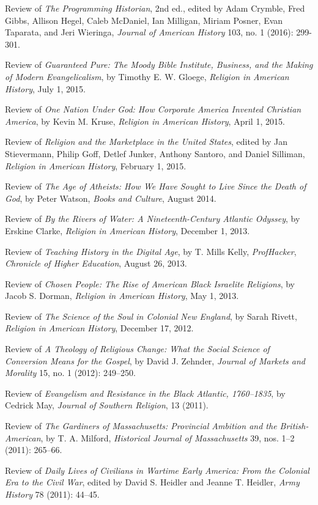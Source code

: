\documentclass[11pt]{article}
\begin{document}
Review of \emph{The Programming Historian}, 2nd ed., edited by
Adam Crymble, Fred Gibbs, Allison Hegel, Caleb McDaniel, Ian Milligan, Miriam 
Posner, Evan Taparata, and Jeri Wieringa, \emph{Journal of American History} 
103, no. 1 (2016): 299-301.

Review of \emph{Guaranteed Pure: The Moody Bible Institute, Business, and the 
  Making of Modern Evangelicalism}, by Timothy E. W. Gloege, \emph{Religion in 
  American History}, July 1, 2015.

Review of \emph{One Nation Under God: How Corporate America Invented Christian 
  America}, by Kevin M. Kruse, \emph{Religion in American History}, April 1, 
2015.

Review of \emph{Religion and the Marketplace in the United States},
edited by Jan Stievermann, Philip Goff, Detlef Junker, Anthony Santoro,
and Daniel Silliman, \emph{Religion in American History}, February 1,
2015.

Review of \emph{The Age of Atheists: How We Have Sought to Live Since
  the Death of God}, by Peter Watson, \emph{Books and Culture}, August
2014.

Review of \emph{By the Rivers of Water: A Nineteenth-Century Atlantic
  Odyssey}, by Erskine Clarke, \emph{Religion in American History},
December 1, 2013.

Review of \emph{Teaching History in the Digital Age}, by T. Mills Kelly,
\emph{ProfHacker}, \emph{Chronicle of Higher Education}, August 26,
2013.

Review of \emph{Chosen People: The Rise of American Black Israelite
  Religions}, by Jacob S. Dorman, \emph{Religion in American History}, May
1, 2013.

Review of \emph{The Science of the Soul in Colonial New England}, by
Sarah Rivett, \emph{Religion in American History}, December 17, 2012.

Review of \emph{A Theology of Religious Change: What the Social Science
  of Conversion Means for the Gospel}, by David J. Zehnder, \emph{Journal
  of Markets and Morality} 15, no. 1 (2012): 249--250.

Review of \emph{Evangelism and Resistance in the Black Atlantic,
  1760--1835}, by Cedrick May, \emph{Journal of Southern Religion}, 13
(2011).

Review of \emph{The Gardiners of Massachusetts: Provincial Ambition and
  the British-American}, by T. A. Milford, \emph{Historical Journal of
  Massachusetts} 39, nos. 1--2 (2011): 265--66.

Review of \emph{Daily Lives of Civilians in Wartime Early America: From
  the Colonial Era to the Civil War}, edited by David S. Heidler and
Jeanne T. Heidler, \emph{Army History} 78 (2011): 44--45.
\end{document}
